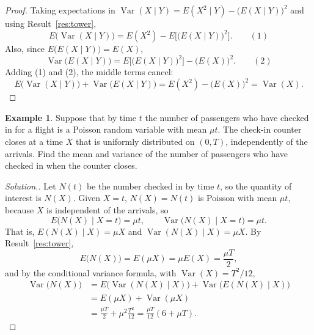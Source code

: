 \documentclass[11pt,a4paper]{article}
\theoremstyle{definition}
\newtheorem{exa}[thm]{Example}
\newenvironment{solution}
  {\renewcommand{\qedsymbol}{}\begin{proof}[\textit{Solution}.]}
  {\end{proof}}
\DeclareMathOperator{\Var}{Var}
\begin{document}
\begin{proof}
Taking expectations in $\Var(X \mid Y) = E(X^2 \mid Y) - \bigl(E(X \mid Y)\bigr)^2$ and using Result~\ref{res:tower},
\[
E\bigl(\Var(X \mid Y)\bigr) = E(X^2) - E\bigl[\bigl(E(X \mid Y)\bigr)^2\bigr] . \qquad (1)
\]
Also, since $E\bigl(E(X \mid Y)\bigr) = E(X)$,
\[
\Var\bigl(E(X \mid Y)\bigr) = E\bigl[\bigl(E(X \mid Y)\bigr)^2\bigr] - \bigl(E(X)\bigr)^2 . \qquad (2)
\]
Adding (1) and (2), the middle terms cancel:
\[
E\bigl(\Var(X \mid Y)\bigr) + \Var\bigl(E(X \mid Y)\bigr) = E(X^2) - \bigl(E(X)\bigr)^2 = \Var(X) .
\]
\end{proof}

\begin{exa}\label{exa:check-in}
Suppose that by time $t$ the number of passengers who have checked in for a flight is a Poisson random variable with mean $\mu t$. The
check-in counter closes at a time $X$ that is uniformly distributed on $(0, T)$, independently of the arrivals. Find the mean and variance
of the number of passengers who have checked in when the counter closes.
\end{exa}

\begin{solution}
Let $N(t)$ be the number checked in by time $t$, so the quantity of interest is $N(X)$. Given $X = t$, $N(X) = N(t)$ is Poisson with mean $\mu t$,
because $X$ is independent of the arrivals, so
\[
E\bigl(N(X) \mid X = t\bigr) = \mu t , \qquad \Var\bigl(N(X) \mid X = t\bigr) = \mu t .
\]
That is, $E(N(X) \mid X) = \mu X$ and $\Var(N(X) \mid X) = \mu X$. By Result~\ref{res:tower},
\[
E\bigl(N(X)\bigr) = E(\mu X) = \mu E(X) = \frac{\mu T}{2} ,
\]
and by the conditional variance formula, with $\Var(X) = T^2/12$,
\begin{align*}
\Var\bigl(N(X)\bigr) &= E\bigl(\Var(N(X) \mid X)\bigr) + \Var\bigl(E(N(X) \mid X)\bigr) \\
&= E(\mu X) + \Var(\mu X) \\
&= \frac{\mu T}{2} + \mu^2\frac{T^2}{12} = \frac{\mu T}{12}(6 + \mu T) .
\end{align*}
\end{solution}
\end{document}

